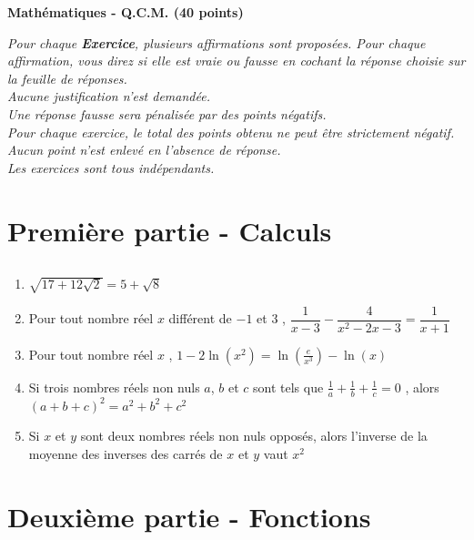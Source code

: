 \documentclass[oneside,12pt]{article}
\begin{document}
\begin{center}
    \large \textbf{Mathématiques - Q.C.M. (40 points)}
\end{center}

\textit{Pour chaque \textbf{Exercice}, plusieurs affirmations sont proposées. Pour chaque affirmation, vous direz si elle est vraie ou fausse en cochant la réponse choisie sur la feuille de réponses. \\
Aucune justification n’est demandée. \\
Une réponse fausse sera pénalisée par des points négatifs. \\
Pour chaque exercice, le total des points obtenu ne peut être strictement négatif. \\
Aucun point n’est enlevé en l’absence de réponse. \\
Les exercices sont tous indépendants.}

\bigskip


\section*{Première partie - Calculs}

\subsection{}
\begin{enumerate}
	\item $\sqrt{17+12\sqrt{2}}=5+\sqrt{8}$
	\item Pour tout nombre réel $x$ différent de $-1$ et $3$ , $\dfrac{1}{x-3}-\dfrac{4}{x^2-2x-3}=\dfrac{1}{x+1}$
	\item Pour tout nombre réel $x$ , $1-2\ln(x^2)=\ln\left(\frac{e}{x^3}\right)-\ln(x)$
	\item Si trois nombres réels non nuls $a$, $b$ et $c$ sont tels que $\frac{1}{a}+\frac{1}{b}+\frac{1}{c}=0$ , alors  \\$(a+b+c)^2=a^2+b^2+c^2$
	\item Si $x$ et $y$ sont deux nombres réels non nuls opposés, alors l'inverse de la moyenne des inverses des carrés de $x$ et $y$ vaut $x^2$
\end{enumerate}



\section*{Deuxième partie - Fonctions}
\end{document}
